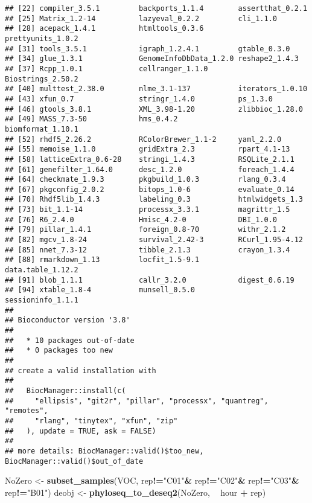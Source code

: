 \documentclass[]{article}
\newenvironment{Shaded}{\begin{snugshade}}{\end{snugshade}}
\newcommand{\KeywordTok}[1]{\textcolor[rgb]{0.13,0.29,0.53}{\textbf{#1}}}
\newcommand{\StringTok}[1]{\textcolor[rgb]{0.31,0.60,0.02}{#1}}
\newcommand{\OperatorTok}[1]{\textcolor[rgb]{0.81,0.36,0.00}{\textbf{#1}}}
\newcommand{\NormalTok}[1]{#1}
\begin{document}
\begin{verbatim}
## [22] compiler_3.5.1         backports_1.1.4        assertthat_0.2.1      
## [25] Matrix_1.2-14          lazyeval_0.2.2         cli_1.1.0             
## [28] acepack_1.4.1          htmltools_0.3.6        prettyunits_1.0.2     
## [31] tools_3.5.1            igraph_1.2.4.1         gtable_0.3.0          
## [34] glue_1.3.1             GenomeInfoDbData_1.2.0 reshape2_1.4.3        
## [37] Rcpp_1.0.1             cellranger_1.1.0       Biostrings_2.50.2     
## [40] multtest_2.38.0        nlme_3.1-137           iterators_1.0.10      
## [43] xfun_0.7               stringr_1.4.0          ps_1.3.0              
## [46] gtools_3.8.1           XML_3.98-1.20          zlibbioc_1.28.0       
## [49] MASS_7.3-50            hms_0.4.2              biomformat_1.10.1     
## [52] rhdf5_2.26.2           RColorBrewer_1.1-2     yaml_2.2.0            
## [55] memoise_1.1.0          gridExtra_2.3          rpart_4.1-13          
## [58] latticeExtra_0.6-28    stringi_1.4.3          RSQLite_2.1.1         
## [61] genefilter_1.64.0      desc_1.2.0             foreach_1.4.4         
## [64] checkmate_1.9.3        pkgbuild_1.0.3         rlang_0.3.4           
## [67] pkgconfig_2.0.2        bitops_1.0-6           evaluate_0.14         
## [70] Rhdf5lib_1.4.3         labeling_0.3           htmlwidgets_1.3       
## [73] bit_1.1-14             processx_3.3.1         magrittr_1.5          
## [76] R6_2.4.0               Hmisc_4.2-0            DBI_1.0.0             
## [79] pillar_1.4.1           foreign_0.8-70         withr_2.1.2           
## [82] mgcv_1.8-24            survival_2.42-3        RCurl_1.95-4.12       
## [85] nnet_7.3-12            tibble_2.1.3           crayon_1.3.4          
## [88] rmarkdown_1.13         locfit_1.5-9.1         data.table_1.12.2     
## [91] blob_1.1.1             callr_3.2.0            digest_0.6.19         
## [94] xtable_1.8-4           munsell_0.5.0          sessioninfo_1.1.1     
## 
## Bioconductor version '3.8'
## 
##   * 10 packages out-of-date
##   * 0 packages too new
## 
## create a valid installation with
## 
##   BiocManager::install(c(
##     "ellipsis", "git2r", "pillar", "processx", "quantreg", "remotes",
##     "rlang", "tinytex", "xfun", "zip"
##   ), update = TRUE, ask = FALSE)
## 
## more details: BiocManager::valid()$too_new, BiocManager::valid()$out_of_date
\end{verbatim}

\begin{Shaded}
\begin{Highlighting}[]
\NormalTok{NoZero <-}\StringTok{ }\KeywordTok{subset_samples}\NormalTok{(VOC, rep}\OperatorTok{!=}\StringTok{"C01"}\OperatorTok{&}\StringTok{ }\NormalTok{rep}\OperatorTok{!=}\StringTok{"C02"}\OperatorTok{&}\StringTok{ }\NormalTok{rep}\OperatorTok{!=}\StringTok{"C03"}\OperatorTok{&}\StringTok{ }\NormalTok{rep}\OperatorTok{!=}\StringTok{"B01"}\NormalTok{)}
\NormalTok{deobj <-}\StringTok{ }\KeywordTok{phyloseq_to_deseq2}\NormalTok{(NoZero, }\OperatorTok{~}\StringTok{ }\NormalTok{hour }\OperatorTok{+}\StringTok{ }\NormalTok{rep)}
\end{Highlighting}
\end{Shaded}
\end{document}
